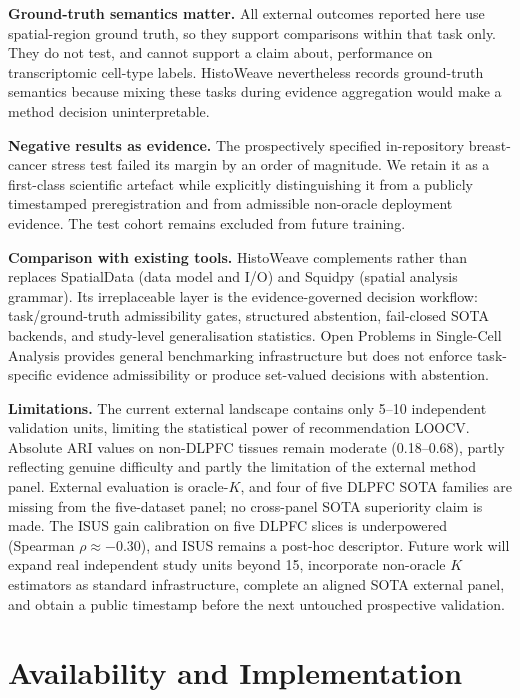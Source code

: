 \documentclass[]{bioinfo}
\begin{document}
\textbf{Ground-truth semantics matter.}
All external outcomes reported here use spatial-region ground truth, so
they support comparisons within that task only. They do not test, and
cannot support a claim about, performance on transcriptomic cell-type
labels. HistoWeave nevertheless records ground-truth semantics because
mixing these tasks during evidence aggregation would make a method
decision uninterpretable.

\textbf{Negative results as evidence.}
The prospectively specified in-repository breast-cancer stress test
failed its margin by an order of magnitude. We retain it as a first-class
scientific artefact while explicitly distinguishing it from a publicly
timestamped preregistration and from admissible non-oracle deployment
evidence. The test cohort remains excluded from future training.

\textbf{Comparison with existing tools.}
HistoWeave complements rather than replaces SpatialData (data model and
I/O) and Squidpy (spatial analysis grammar). Its irreplaceable layer is
the evidence-governed decision workflow: task/ground-truth admissibility
gates, structured abstention, fail-closed SOTA backends, and study-level
generalisation statistics. Open Problems in Single-Cell Analysis provides
general benchmarking infrastructure but does not enforce task-specific
evidence admissibility or produce set-valued decisions with abstention.

\textbf{Limitations.}
The current external landscape contains only 5--10 independent
validation units, limiting the statistical power of recommendation
LOOCV. Absolute ARI values on non-DLPFC tissues remain moderate
(0.18--0.68), partly reflecting genuine difficulty and partly the
limitation of the external method panel. External evaluation is
oracle-\(K\), and four of five DLPFC SOTA families are missing from the
five-dataset panel; no cross-panel SOTA superiority claim is made. The
ISUS gain calibration on five DLPFC slices is underpowered (Spearman
$\rho \approx -0.30$), and ISUS remains a post-hoc descriptor. Future
work will expand real independent study units beyond 15, incorporate
non-oracle \(K\) estimators as standard infrastructure, complete an
aligned SOTA external panel, and obtain a public timestamp before the
next untouched prospective validation.

\section{Availability and Implementation}
\end{document}

